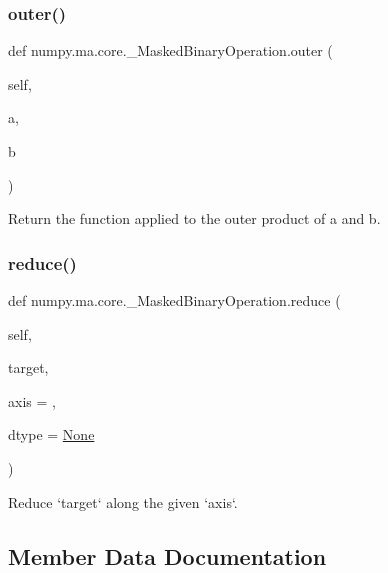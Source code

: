 \subsubsection{\texorpdfstring{outer()}{outer()}}
{\footnotesize\ttfamily def numpy.\+ma.\+core.\+\_\+\+Masked\+Binary\+Operation.\+outer (\begin{DoxyParamCaption}\item[{}]{self,  }\item[{}]{a,  }\item[{}]{b }\end{DoxyParamCaption})}

\begin{DoxyVerb}Return the function applied to the outer product of a and b.\end{DoxyVerb}
 \mbox{\label{classnumpy_1_1ma_1_1core_1_1__MaskedBinaryOperation_a91abf0a92e6991b04f733cd25f02fb40}} 
\subsubsection{\texorpdfstring{reduce()}{reduce()}}
{\footnotesize\ttfamily def numpy.\+ma.\+core.\+\_\+\+Masked\+Binary\+Operation.\+reduce (\begin{DoxyParamCaption}\item[{}]{self,  }\item[{}]{target,  }\item[{}]{axis = {},  }\item[{}]{dtype = {\ttfamily \hyperlink{namespacenumpy_1_1ma_1_1core_a647ee1848dfa3692fe35a663a2aa40b3}{None}} }\end{DoxyParamCaption})}

\begin{DoxyVerb}Reduce `target` along the given `axis`.\end{DoxyVerb}
 

\subsection{Member Data Documentation}
\mbox{\label{classnumpy_1_1ma_1_1core_1_1__MaskedBinaryOperation_a61f16041049af788ed536efab9e6608c}} 

